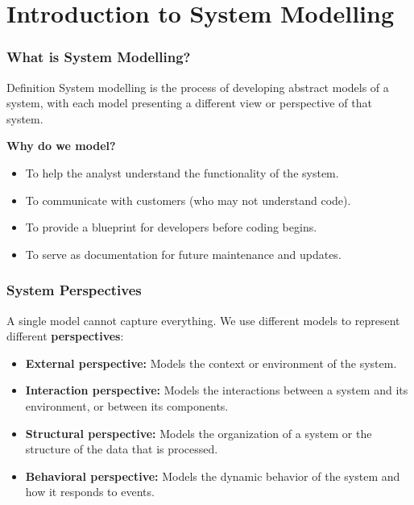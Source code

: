 \documentclass[xcolor=table]{beamer}
\begin{document}
\section{Introduction to System Modelling}

\begin{frame}
    \frametitle{What is System Modelling?}
    \begin{block}{Definition}
        System modelling is the process of developing abstract models of a system, with each model presenting a different view or perspective of that system.
    \end{block}
    
    \vspace{0.3cm}
    \textbf{Why do we model?}
    \begin{itemize}
        \item To help the analyst understand the functionality of the system.
        \item To communicate with customers (who may not understand code).
        \item To provide a blueprint for developers before coding begins.
        \item To serve as documentation for future maintenance and updates.
    \end{itemize}
\end{frame}

\begin{frame}
    \frametitle{System Perspectives}
    A single model cannot capture everything. We use different models to represent different \textbf{perspectives}:
    
    \vspace{0.3cm}
    \begin{itemize}
        \item \textbf{External perspective:} Models the context or environment of the system.
        \item \textbf{Interaction perspective:} Models the interactions between a system and its environment, or between its components.
        \item \textbf{Structural perspective:} Models the organization of a system or the structure of the data that is processed.
        \item \textbf{Behavioral perspective:} Models the dynamic behavior of the system and how it responds to events.
    \end{itemize}
\end{frame}
\end{document}
